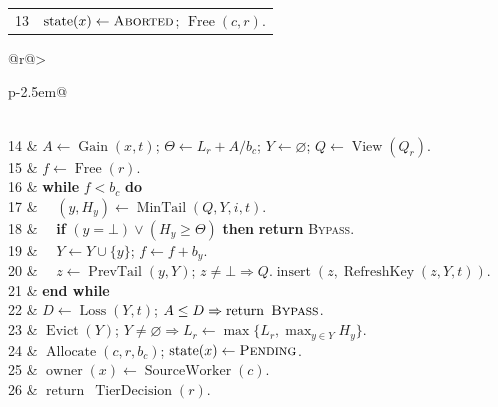 \begin{algorithm*}[tp]
\begin{minipage}[t]{.48\textwidth}
\begin{tabular}[t]{@{}r@{\hspace{0.5em}}>{\raggedright\arraybackslash}p{\dimexpr\linewidth-2.5em\relax}@{}}
13 & $\operatorname{state}(x)\gets\textsc{Aborted}$; $\operatorname{Free}(c,r)$.\\
\end{tabular}
\end{minipage}\hfill
\begin{minipage}[t]{.48\textwidth}
\vspace{0pt}
\begin{tabular}[t]{@{}r@{\hspace{0.5em}}>{\raggedright\arraybackslash}p{\dimexpr\linewidth-2.5em\relax}@{}}
\\
14 & $A\gets\operatorname{Gain}(x,t)$; $\Theta\gets L_r+A/b_c$; $Y\gets\varnothing$; $Q\gets\operatorname{View}(Q_r)$.\\
15 & $f\gets\operatorname{Free}(r)$.\\
16 & \textbf{while} $f<b_c$ \textbf{do}\\
17 & $\quad(y,H_y)\gets\operatorname{MinTail}(Q,Y,i,t)$.\\
18 & $\quad$\textbf{if} $(y=\bot)\lor(H_y\ge\Theta)$ \textbf{then} \textbf{return} \textsc{Bypass}.\\
19 & $\quad Y\gets Y\cup\{y\}$; $f\gets f+b_y$.\\
20 & $\quad z\gets\operatorname{PrevTail}(y,Y)$; $z\ne\bot\Rightarrow Q.\operatorname{insert}(z,\operatorname{RefreshKey}(z,Y,t))$.\\
21 & \textbf{end while}\\
22 & $D\gets\operatorname{Loss}(Y,t)$; $A\le D\Rightarrow\operatorname{return}\ \textsc{Bypass}$.\\
23 & $\operatorname{Evict}(Y)$; $Y\ne\varnothing\Rightarrow L_r\gets\max\{L_r,\max_{y\in Y}H_y\}$.\\
24 & $\operatorname{Allocate}(c,r,b_c)$; $\operatorname{state}(x)\gets\textsc{Pending}$.\\
25 & $\operatorname{owner}(x)\gets\operatorname{SourceWorker}(c)$.\\
26 & $\operatorname{return}\ \operatorname{TierDecision}(r)$.\\
\end{tabular}
\end{minipage}
\end{algorithm*}
